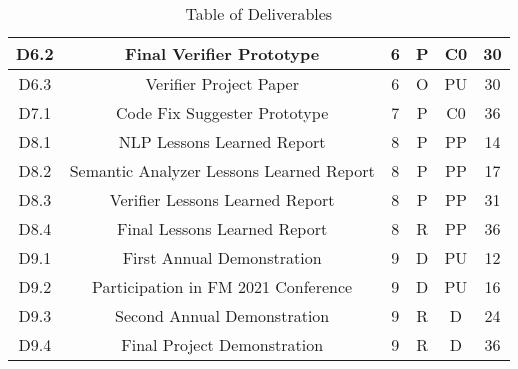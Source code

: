\begin{table}[hbpt]
\begin{adjustbox}{width=1\textwidth}
\begin{tabular}{ |c|c|c|c|c|c|}
			D6.2 & Final Verifier Prototype & 6 & P & C0 & 30\\
			\hline
			
			D6.3 & Verifier Project Paper & 6 & O & PU & 30\\
			\hline
			
			D7.1 & Code Fix Suggester Prototype & 7 & P & C0 & 36\\
			\hline
			
			D8.1 & \gls{NLP} Lessons Learned Report & 8 & P & PP & 14\\
			\hline
			
			D8.2 & Semantic Analyzer Lessons Learned Report & 8 & P & PP & 17\\
			\hline
			
			D8.3 & Verifier Lessons Learned Report & 8 & P & PP & 31\\
			\hline
			
			D8.4 & Final Lessons Learned Report & 8 & R & PP & 36\\
			\hline
			
			D9.1 & First Annual Demonstration & 9 & D & PU & 12\\
			\hline
			
			D9.2 & Participation in FM 2021 Conference & 9 & D & PU & 16\\
			\hline
			
			D9.3 & Second Annual Demonstration & 9 & R & D & 24\\
			\hline
			
			D9.4 & Final Project Demonstration & 9 & R & D & 36\\
			\hline
			
		\end{tabular}
	\end{adjustbox}
\caption{Table of Deliverables}
\end{table}